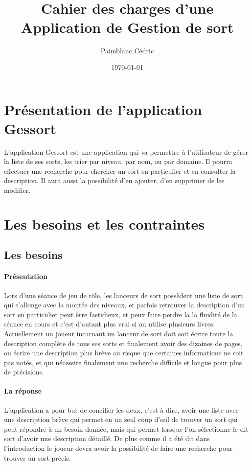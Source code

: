 \documentclass[a4paper, 11pt]{report}
\author{Paimblanc Cédric}
\date{\today}
\title{Cahier des charges d'une Application de Gestion de sort}
\newcommand{\ges}{Gessort }
\begin{document}
	\maketitle
	\tableofcontents
	\newpage
	\section{Présentation de l'application \ges}
	\label{sec:mise_en_contexte_de_l_application}
		L'application \ges est une application qui va permettre à l'utilisateur de gérer la liste de ses
		sorts, les trier par niveau, par nom, ou par domaine. Il pourra effectuer une recherche pour
		chercher un sort en particulier et en consulter la description. Il aura aussi la possibilité
		d'en ajouter, d'en supprimer de les modifier.
	\section{Les besoins et les contraintes}	
	\label{sec:Les besoins et les contraintes}
		\subsection{Les besoins}
			\paragraph{Présentation} Lors d'une séance de jeu de rôle, les lanceurs de sort possèdent 
			une liste de sort qui s'allonge avec la montée des niveaux, et parfois retrouver la description 
			d'un sort en particulier peut être fastidieux, et peux faire perdre la 
			la fluidité de la séance en cours et c'est d'autant plus vrai 
			si on utilise plusieurs livres.\\
			Actuellement un joueur incarnant  un lanceur de sort doit soit écrire toute la description 
			complète de tous ses sorts  et finalement avoir des dizaines de  pages, ou écrire une 
			description plus brève au risque que certaines informations ne soit pas notés, et qui 
			nécessite finalement une recherche difficile et longue pour plus de précisions. 
			\paragraph{La réponse} L'application a pour but de concilier les deux, c'est à dire, 
			avoir une liste avec une description brève qui permet en un seul coup d'œil de trouver 
			un sort qui peut répondre à un besoin donnée, mais qui permet lorsque l'on sélectionne le dit sort d'avoir une 
			description détaillé. De plus comme il a été dit dans l'introduction le joueur devra avoir
			la possibilité de faire une recherche pour trouver un sort précis.  
\end{document}
